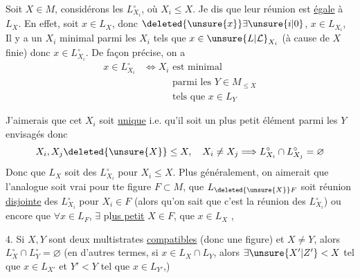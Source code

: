 Soit $X\in M$, considérons les $L_{X_i}^{\circ}$, où $X_i\leq X$. Je dis que leur réunion  est \uline{égale} à $L_X$. En effet, soit $x\in L_X$, donc $\deleted{\unsure{x}}\exists\unsure{i|0}$, $x\in L_{X_i}$,  Il y a un $X_i$ minimal parmi les
$X_i$ tels que $x\in\unsure{L|\mathcal{L}}_{X_i}$ (à cause   de $X$ finie) donc $x\in L_{X_i}^{\circ}$. De façon précise, on a
\[
\begin{aligned}
 x\in L_{X_i}^{\circ}&\Longleftrightarrow X_i\text{ est minimal}\\
 &\hspace{3em}\text{parmi les }Y\in M_{\leq X}\\
 &\hspace{3em}\text{tels que }x\in L_Y
\end{aligned}
\]

J'aimerais que cet $X_i$ soit \uline{unique} i.e. qu'il soit un plus petit élément parmi les $Y$ envisagés donc
\[
 X_i,X_j\deleted{\unsure{X}}\leq X,\quad X_i\ne X_j\Longrightarrow L_{X_i}^{\circ}\cap L_{X_j}^{\circ}=\varnothing
\]
Donc que $L_X$ soit  \uline{} des $L_{X_i}^{\circ}$ pour $X_i\leq X$. Plus généralement, on aimerait que l'analogue soit vrai pour tte figure $F\subset M$,  que $L_{\deleted{\unsure{X}}F}$ soit réunion \uline{disjointe} des  $L_{X_i}^{\circ}$ pour $X_i\in F$ (alors qu'on sait  que c'est la réunion des $L_{X_i}^{\circ}$) ou encore que $\forall x\in L_F$, $\exists$ pl\uline{us petit} $X\in F$,  que $x\in L_X$ ,

\uline{} 4. Si $X,Y$ sont deux multistrates \uline{compatibles} (donc   une figure) et $X\ne Y$, alors $L_X^{\circ}\cap L_Y^{\circ}=\varnothing$ (en d'autres termes, si $x\in L_X\cap L_Y$, alors  $\exists\unsure{X'|Z'}<X$ tel que $x\in L_{X'}$ et  $Y'<Y$ tel que $x\in L_{Y'}$,) 

